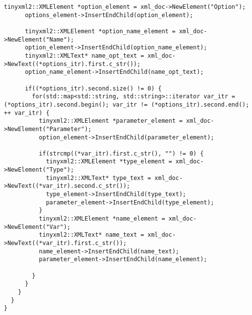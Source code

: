 \documentclass[a4paper,11pt,twoside]{book}
\begin{document}
\begin{lstlisting}[language=CCC, caption=pragma\_handler/Node.cpp]
      tinyxml2::XMLElement *option_element = xml_doc->NewElement("Option");
      options_element->InsertEndChild(option_element);

      tinyxml2::XMLElement *option_name_element = xml_doc->NewElement("Name");
      option_element->InsertEndChild(option_name_element);
      tinyxml2::XMLText* name_opt_text = xml_doc->NewText((*options_itr).first.c_str());
      option_name_element->InsertEndChild(name_opt_text);

      if((*options_itr).second.size() != 0) {
        for(std::map<std::string, std::string>::iterator var_itr = (*options_itr).second.begin(); var_itr != (*options_itr).second.end(); ++ var_itr) {
          tinyxml2::XMLElement *parameter_element = xml_doc->NewElement("Parameter");
          option_element->InsertEndChild(parameter_element);

          if(strcmp((*var_itr).first.c_str(), "") != 0) {
            tinyxml2::XMLElement *type_element = xml_doc->NewElement("Type");
            tinyxml2::XMLText* type_text = xml_doc->NewText((*var_itr).second.c_str());
            type_element->InsertEndChild(type_text);
            parameter_element->InsertEndChild(type_element);
          }
          tinyxml2::XMLElement *name_element = xml_doc->NewElement("Var");
          tinyxml2::XMLText* name_text = xml_doc->NewText((*var_itr).first.c_str());
          name_element->InsertEndChild(name_text);
          parameter_element->InsertEndChild(name_element);

        }
      }
    }
  }
}
\end{lstlisting}
\end{document}
